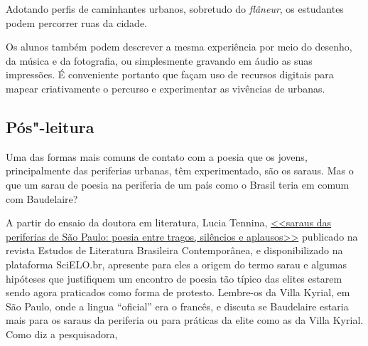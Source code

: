 \documentclass[12pt]{extarticle}
\begin{document}
Adotando perfis de caminhantes urbanos, sobretudo do \textit{flâneur}, os
estudantes podem percorrer ruas da cidade.

Os alunos também podem descrever a mesma experiência por meio do desenho, 
da música e da fotografia, ou simplesmente gravando em áudio as 
suas impressões. É conveniente portanto que façam uso
de recursos digitais para mapear criativamente o percurso e
experimentar as vivências de urbanas.



\subsection{Pós"-leitura}




Uma das formas mais comuns de contato com a poesia que os jovens, 
principalmente das periferias urbanas, têm experimentado, são 
os saraus. Mas o que um sarau de poesia na periferia de um 
país como o Brasil teria em comum com Baudelaire? 

A partir do ensaio da doutora em literatura, Lucia Tennina, 
\href{http://www.scielo.br/pdf/elbc/n42/01.pdf}{<<saraus das periferias de São Paulo:
poesia entre tragos, silêncios e aplausos>>} publicado na revista 
Estudos de Literatura Brasileira Contemporânea, e disponibilizado 
na plataforma SciELO.br, apresente para eles a origem do termo 
sarau e algumas hipóteses que justifiquem um encontro de poesia
tão típico das elites estarem sendo agora praticados como forma 
de protesto. Lembre-os da Villa Kyrial, em São Paulo, 
onde a lingua ``oficial'' era o francês, e discuta se Baudelaire 
estaria mais para os saraus da periferia ou para práticas 
da elite como as da Villa Kyrial. Como diz a pesquisadora, 
\end{document}
